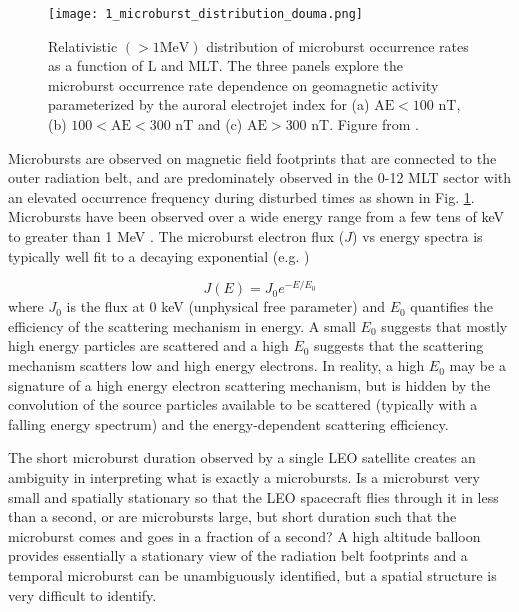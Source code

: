 \begin{figure}
\texttt{[image: 1\_microburst\_distribution\_douma.png]}
\caption{Relativistic $(> 1 \mathrm{MeV})$ distribution of microburst occurrence rates as a function of L and MLT. The three panels explore the microburst occurrence rate dependence on geomagnetic activity parameterized by the auroral electrojet index for (a) $\mathrm{AE} < 100$ nT, (b) $100 < \mathrm{AE} < 300$ nT and (c) $\mathrm{AE} > 300$ nT. Figure from \citet{Douma2017}.}
\label{Intro:microburst_distribution}
\end{figure}

Microbursts are observed on magnetic field footprints that are connected to the outer radiation belt, and are predominately observed in the 0-12 MLT sector with an elevated occurrence frequency during disturbed times as shown in Fig. \ref{Intro:microburst_distribution}. Microbursts have been observed over a wide energy range from a few tens of keV \citep{Datta1997} to greater than 1 MeV \citep[e.g.][]{Blake1996, Greeley2019}. The microburst electron flux ($J$) vs energy spectra is typically well fit to a decaying exponential (e.g. \citep{Parks1967, Lee2005})

\begin{equation}
J(E) = J_0 e^{-E/E_0}
\end{equation} where $J_0$ is the flux at 0 keV (unphysical free parameter) and $E_0$ quantifies the efficiency of the scattering mechanism in energy. A small $E_0$ suggests that mostly high energy particles are scattered and a high $E_0$ suggests that the scattering mechanism scatters low and high energy electrons. In reality, a high $E_0$ may be a signature of a high energy electron scattering mechanism, but is hidden by the convolution of the source particles available to be scattered (typically with a falling energy spectrum) and the energy-dependent scattering efficiency.

The short microburst duration observed by a single LEO satellite creates an ambiguity in interpreting what is exactly a microbursts. Is a microburst very small and spatially stationary so that the LEO spacecraft flies through it in less than a second, or are microbursts large, but short duration such that the microburst comes and goes in a fraction of a second? A high altitude balloon provides essentially a stationary view of the radiation belt footprints and a temporal microburst can be unambiguously identified, but a spatial structure is very difficult to identify.


